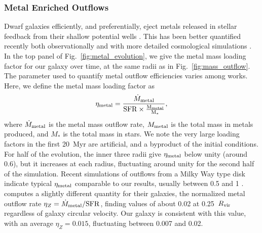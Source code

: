 \documentclass[twocolumn]{aastex61}
\begin{document}
\subsubsection{Metal Enriched Outflows}
Dwarf galaxies efficiently, and preferentially, eject metals released in stellar feedback from their shallow potential wells \citep{MacLowFerrara1999,FerraraTolstoy2000}. This has been better quantified recently both observationally \citep[e.g.][]{Kirby2011-metals,Zahid2012,Peeples2014,McQuinn2015} and with more detailed cosmological simulations \citep{Angles-Alcazar2017,Muratov2017}. In the top panel of Fig.~\ref{fig:metal_evolution}, we give the metal mass loading factor for our galaxy over time, at the same radii as in Fig.~\ref{fig:mass_outflow}. The parameter used to quantify metal outflow efficiencies varies among works. Here, we define the metal mass loading factor as
\begin{equation} \label{eq:eta-metal}
\eta_{\rm metal} = \frac{\dot{M}_{\rm metal}}{\rm{SFR} \times \frac{M_{\rm metal}}{M_{*}}},
\end{equation}
where $\dot{M}_{\rm metal}$ is the metal mass outflow rate, $M_{\rm metal}$ is the total mass in metals produced, and $M_{*}$ is the total mass in stars. We note the very large loading factors in the first 20~Myr are artificial, and a byproduct of the initial conditions. For half of the evolution, the inner three radii give $\eta_{\rm metal}$ below unity (around 0.6), but it increases at each radius, fluctuating around unity for the second half of the simulation. Recent simulations of outflows from a Milky Way type disk indicate typical $\eta_{\rm metal}$ comparable to our results, usually between 0.5 and 1 \citep{Li2017,Fielding2017}. \cite{Muratov2017} computes a slightly different quantity for their galaxies, the normalized metal outflow rate $\eta_{Z} = \dot{M}_{\rm metal}/{\rm SFR}$, finding values of about 0.02 at 0.25~$R_{\rm vir}$ regardless of galaxy circular velocity. Our galaxy is consistent with this value, with an average $\eta_Z = 0.015$, fluctuating between 0.007 and 0.02.
\end{document}
